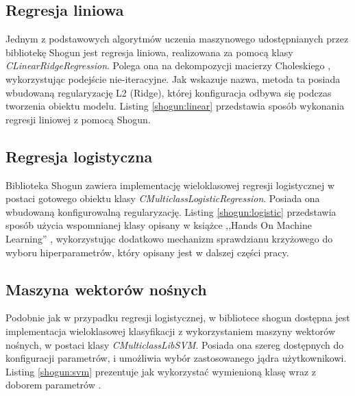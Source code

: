 \subsection{Regresja liniowa}
Jednym z podstawowych algorytmów uczenia maszynowego udostępnianych przez bibliotekę Shogun jest regresja liniowa, realizowana za pomocą klasy \textit{CLinearRidgeRegression}. Polega ona na dekompozycji macierzy Choleskiego \cite{handsOnMachineLearning}, wykorzystując podejście nie-iteracyjne. Jak wskazuje nazwa, metoda ta posiada wbudowaną regularyzację L2 (Ridge), której konfiguracja odbywa się podczas tworzenia obiektu modelu. Listing \ref{shogun:linear} przedstawia sposób wykonania regresji liniowej z pomocą Shogun.


\subsection{Regresja logistyczna}
Biblioteka Shogun zawiera implementację wieloklasowej regresji logistycznej w postaci gotowego obiektu klasy \textit{CMulticlassLogisticRegression}. Posiada ona wbudowaną konfigurowalną regularyzację. Listing \ref{shogun:logistic} przedstawia sposób użycia wspomnianej klasy opisany w książce ,,Hands On Machine Learning'' \cite{handsOnMachineLearning}, wykorzystując dodatkowo mechanizm sprawdzianu krzyżowego do wyboru hiperparametrów, który opisany jest w dalszej części pracy.


\subsection{Maszyna wektorów nośnych}
Podobnie jak w przypadku regresji logistycznej, w bibliotece shogun dostępna jest implementacja wieloklasowej klasyfikacji z wykorzystaniem maszyny wektorów nośnych, w postaci klasy \textit{CMulticlassLibSVM}. Posiada ona szereg dostępnych do konfiguracji parametrów, i umożliwia wybór zastosowanego jądra użytkownikowi. Listing \ref{shogun:svm} prezentuje jak wykorzystać wymienioną klasę wraz z doborem parametrów \cite{handsOnMachineLearning}.


